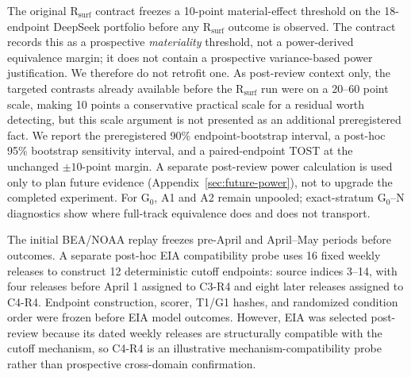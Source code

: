 The original R$_{\mathrm{surf}}$ contract freezes a 10-point material-effect threshold on the 18-endpoint DeepSeek portfolio before any R$_{\mathrm{surf}}$ outcome is observed. The contract records this as a prospective \emph{materiality} threshold, not a power-derived equivalence margin; it does not contain a prospective variance-based power justification. We therefore do not retrofit one. As post-review context only, the targeted contrasts already available before the R$_{\mathrm{surf}}$ run were on a 20--60 point scale, making 10 points a conservative practical scale for a residual worth detecting, but this scale argument is not presented as an additional preregistered fact. We report the preregistered 90\% endpoint-bootstrap interval, a post-hoc 95\% bootstrap sensitivity interval, and a paired-endpoint TOST at the unchanged $\pm10$-point margin. A separate post-review power calculation is used only to plan future evidence (Appendix~\ref{sec:future-power}), not to upgrade the completed experiment. For G$_0$, A1 and A2 remain unpooled; exact-stratum G$_0$--N diagnostics show where full-track equivalence does and does not transport.

The initial BEA/NOAA replay freezes pre-April and April--May periods before outcomes. A separate post-hoc EIA compatibility probe uses 16 fixed weekly releases to construct 12 deterministic cutoff endpoints: source indices 3--14, with four releases before April 1 assigned to C3-R4 and eight later releases assigned to C4-R4. Endpoint construction, scorer, T1/G1 hashes, and randomized condition order were frozen before EIA model outcomes. However, EIA was selected post-review because its dated weekly releases are structurally compatible with the cutoff mechanism, so C4-R4 is an illustrative mechanism-compatibility probe rather than prospective cross-domain confirmation.
